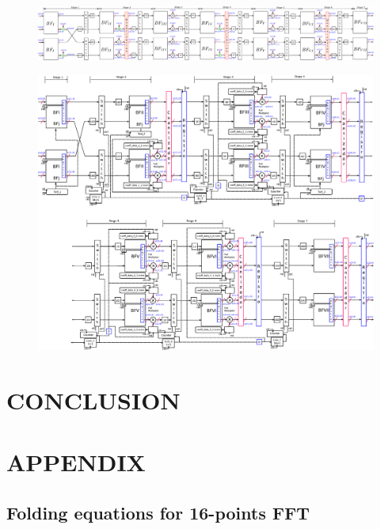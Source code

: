\documentclass[journal,comsoc]{IEEEtran}
\begin{document}
\begin{figure}[htbp]
	\centering
	\includegraphics[width=0.95\linewidth]{Diagramas/miSeccionFiguras/4Paralelo128pRadix8Cuantizacion1}
	\caption{}
	\label{fig:4paralelo128pradix8cuantizacion1}
\end{figure}
\begin{figure}[htbp]%
	\centering
	\includegraphics[width=0.95\linewidth]{Diagramas/V5_esquema_p.eps} 
\end{figure}

\section{CONCLUSION}
\section*{APPENDIX}
\subsection{Folding equations for 16-points FFT}
\end{document}
